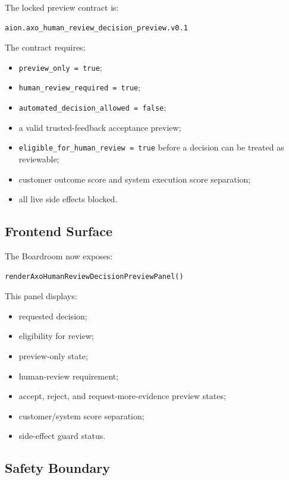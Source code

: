The locked preview contract is:

\begin{verbatim}
aion.axo_human_review_decision_preview.v0.1
\end{verbatim}

The contract requires:

\begin{itemize}
  \item \texttt{preview\_only = true};
  \item \texttt{human\_review\_required = true};
  \item \texttt{automated\_decision\_allowed = false};
  \item a valid trusted-feedback acceptance preview;
  \item \texttt{eligible\_for\_human\_review = true} before a decision can be treated as reviewable;
  \item customer outcome score and system execution score separation;
  \item all live side effects blocked.
\end{itemize}

\subsection{Frontend Surface}

The Boardroom now exposes:

\begin{verbatim}
renderAxoHumanReviewDecisionPreviewPanel()
\end{verbatim}

This panel displays:

\begin{itemize}
  \item requested decision;
  \item eligibility for review;
  \item preview-only state;
  \item human-review requirement;
  \item accept, reject, and request-more-evidence preview states;
  \item customer/system score separation;
  \item side-effect guard status.
\end{itemize}

\subsection{Safety Boundary}

